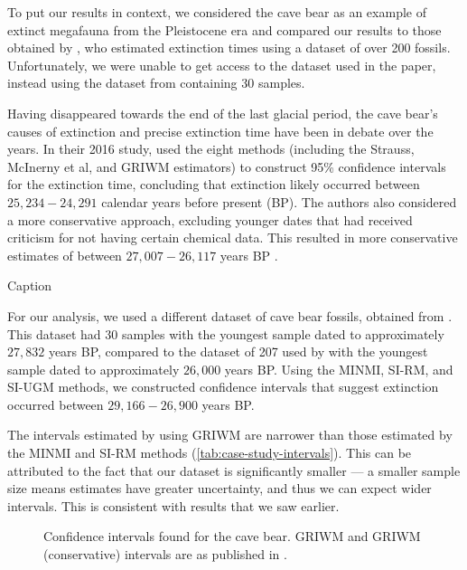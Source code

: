 To put our results in context, we considered the cave bear as an example of extinct megafauna from the Pleistocene era and compared our results to those obtained by \citet{Baca2016}, who estimated extinction times using a dataset of over 200 fossils. Unfortunately, we were unable to get access to the dataset used in the paper, instead using the dataset from \citet{Cooper2015} containing 30 samples.

Having disappeared towards the end of the last glacial period, the cave bear's causes of extinction and precise extinction time have been in debate over the years. In their 2016 study, \citet{Baca2016} used the eight methods (including the Strauss, McInerny et al, and GRIWM estimators) to construct 95\% confidence intervals for the extinction time, concluding that extinction likely occurred between $25,234 - 24,291$ calendar years before present (BP). The authors also considered a more conservative approach, excluding younger dates that had received criticism for not having certain chemical data. This resulted in more conservative estimates of between $27,007 - 26,117$ years BP \cite{Baca2016}. %
\begin{table}[ht]
    \centering
    \caption{Caption}
    
    \label{tab:case-study-intervals}
    \vspace{-4mm}
\end{table}

For our analysis, we used a different dataset of cave bear fossils, obtained from \citet{Cooper2015}. This dataset had 30 samples with the youngest sample dated to approximately $27,832$ years BP, compared to the dataset of 207 used by \citet{Baca2016} with the youngest sample dated to approximately $26,000$ years BP. Using the MINMI, SI-RM, and SI-UGM methods, we constructed confidence intervals that suggest extinction occurred between $29,166 - 26,900$ years BP.

The intervals estimated by \citet{Baca2016} using GRIWM are narrower than those estimated by the MINMI and SI-RM methods (\autoref{tab:case-study-intervals}). This can be attributed to the fact that our dataset is significantly smaller --- a smaller sample size means estimates have greater uncertainty, and thus we can expect wider intervals. This is consistent with results that we saw earlier.
\begin{figure}[ht]
    \centering
    
    \caption{Confidence intervals found for the cave bear. GRIWM and GRIWM (conservative) intervals are as published in \citet{Baca2016}.}
    \label{fig:application-cave-bear}
\end{figure}

